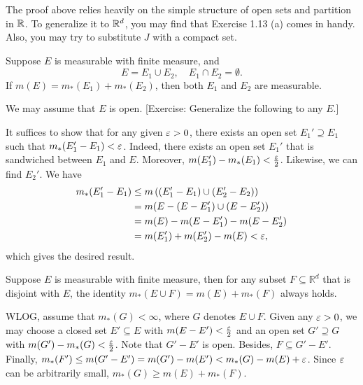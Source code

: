 \begin{note}
  The proof above relies heavily on the simple structure of open sets and partition in $\mathbb{R}$. To generalize it to $\mathbb{R}^d$, you may find that Exercise 1.13 (a) comes in handy. Also, you may try to substitute $J$ with a compact set.
\end{note}

\begin{Problem}[5]
  Suppose $E$ is measurable with finite measure, and
  $$
  E=E_1\cup E_2,\quad E_1\cap E_2=\emptyset.
  $$
  If $m(E)=m_*(E_1)+m_*(E_2)$, then both $E_1$ and $E_2$ are measurable.
\end{Problem}


\begin{Solution}
  We may assume that $E$ is open. [Exercise: Generalize the following to any $E$.]

  It suffices to show that for any given $\varepsilon>0$, there exists an open set $E_1'\supseteq E_1$ such that $m_*(E_1'-E_1)<\varepsilon$.
  Indeed, there exists an open set $E_1'$ that is sandwiched between $E_1$ and $E$. Moreover, $m(E_1')-m_*(E_1)<\frac{\varepsilon}2$. Likewise, we can find $E_2'$. We have
  \begin{align*}
  m_*(E_1'-E_1)&\leq m\left((E_1'-E_1)\cup(E_2'-E_2)\right)\\
  &=m(E-(E-E_1')\cup(E-E_2'))\\
  &=m(E)-m(E-E_1')-m(E-E_2')\\
  &=m(E_1')+m(E_2')-m(E)<\varepsilon,
  \end{align*}
  which gives the desired result.
\end{Solution}

\begin{Problem}[5']
	Suppose $E$ is measurable with finite measure, then for any subset $F\subseteq\mathbb{R}^d$ that is disjoint with $E$, the identity $m_*(E\cup F)=m(E)+m_*(F)$ always holds.
\end{Problem}

\begin{Solution}
  WLOG, assume that $m_*(G)<\infty$, where $G$ denotes $E\cup F$. Given any $\varepsilon>0$, we may choose a closed set $E'\subseteq E$ with $m(E-E')<\frac{\varepsilon}{2}$ and an open set $G'\supseteq G$ with $m(G')-m_*(G)<\frac{\varepsilon}{2}$.
  Note that $G'-E'$ is open. Besides, $F\subseteq G'-E'$. Finally, $m_*(F')\leq m(G'-E')=m(G')-m(E')<m_*(G)-m(E)+\varepsilon$. Since $\varepsilon$ can be arbitrarily small, $m_*(G)\geq m(E)+m_*(F)$.
\end{Solution}

